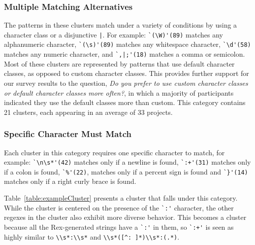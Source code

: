 \subsubsection{Multiple Matching Alternatives}
The patterns in these clusters match under a variety of conditions by using a character class or a disjunctive \verb!|!.
For example:
\verb!`(\W)'(89)! matches any alphanumeric character, \verb!`(\s)'(89)! matches any whitespace character, \verb!`\d'(58)! matches any numeric character, and \verb!`,|;'(18)! matches a comma or semicolon.  Most of these clusters are represented by patterns that use default character classes, as opposed to custom character classes.  This provides further support for our survey results to the question, \emph{Do you prefer to use custom character classes or default character classes more often?}, in which a majority of participants indicated they use the default classes more than custom.
This category contains 21 clusters, each appearing in an average of 33 projects.


\subsubsection{Specific Character Must Match}
\label{cluster:single}
Each cluster in this category requires one specific character to match, for example:
\verb!`\n\s*'(42)! matches only if a newline is found, \verb!`:+'(31)! matches only if a colon is found, \verb!`%'(22)!, matches only if a percent sign is found and \verb!`}'(14)! matches only if a right curly brace is found.



Table~\ref{table:exampleCluster} presents a cluster that falls under this category. While the cluster is centered on the presence of the \verb!`:'! character, the other regexes in the cluster also exhibit more diverse behavior. This becomes a cluster because all the Rex-generated strings have a \verb!`:'! in them, so \verb!`:+'! is seen as highly similar to \verb!\\s*:\\s*! and \verb!\\s*([^: ]*)\\s*:(.*)!.


